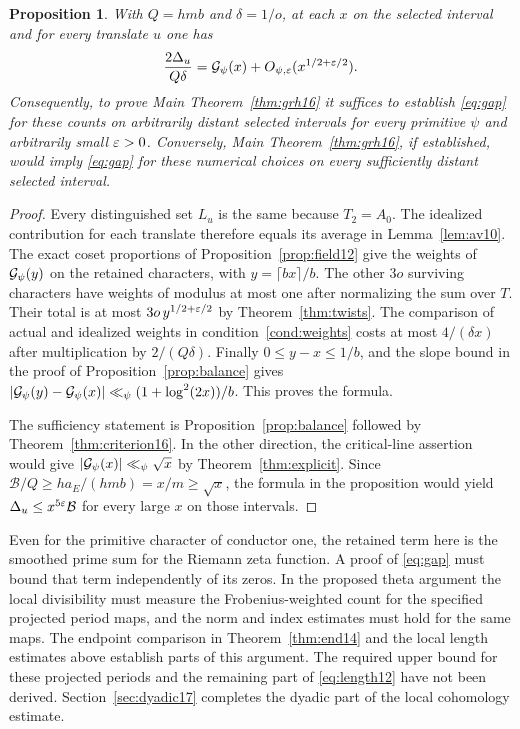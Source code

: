 \documentclass[a4paper,11pt]{article}
\newtheorem{proposition}{Proposition}[section]
\theoremstyle{definition}
\theoremstyle{remark}
\numberwithin{equation}{section}
\begin{document}
\begin{proposition}\label{prop:actual16}
With \(Q=hmb\) and \(\delta=1/o\), at each \(x\) on the selected interval and for every translate \(u\) one has
\[
       \frac{2\Delta_u}{Q\delta}
          =\mathcal G_\psi(x)+O_{\psi,\varepsilon}(x^{1/2+\varepsilon/2}).
\]
Consequently, to prove Main Theorem~\ref{thm:grh16} it suffices to establish \eqref{eq:gap} for these counts on arbitrarily distant selected intervals for every primitive \(\psi\) and arbitrarily small \(\varepsilon>0\). Conversely, Main Theorem~\ref{thm:grh16}, if established, would imply \eqref{eq:gap} for these numerical choices on every sufficiently distant selected interval.
\end{proposition}
\begin{proof}
Every distinguished set \(L_u\) is the same because \(T_2=A_0\). The idealized contribution for each translate therefore equals its average in Lemma~\ref{lem:av10}. The exact coset proportions of Proposition~\ref{prop:field12} give the weights of \(\mathcal G_\psi(y)\) on the retained characters, with \(y=\lceil bx\rceil/b\). The other \(3o\) surviving characters have weights of modulus at most one after normalizing the sum over \(T\). Their total is at most \(3o\,y^{1/2+\varepsilon/2}\) by Theorem~\ref{thm:twists}. The comparison of actual and idealized weights in condition~\ref{cond:weights} costs at most \(4/(\delta x)\) after multiplication by \(2/(Q\delta)\). Finally \(0\le y-x\le1/b\), and the slope bound in the proof of Proposition~\ref{prop:balance} gives \(|\mathcal G_\psi(y)-\mathcal G_\psi(x)|\ll_\psi(1+\log^2(2x))/b\). This proves the formula.

The sufficiency statement is Proposition~\ref{prop:balance} followed by Theorem~\ref{thm:criterion16}. In the other direction, the critical-line assertion would give \(|\mathcal G_\psi(x)|\ll_\psi\sqrt x\) by Theorem~\ref{thm:explicit}. Since \(\mathcal B/Q\ge h a_E/(hmb)=x/m\ge\sqrt x\), the formula in the proposition would yield \(\Delta_u\le x^{5\varepsilon}\mathcal B\) for every large \(x\) on those intervals.
\end{proof}

Even for the primitive character of conductor one, the retained term here is the smoothed prime sum for the Riemann zeta function. A proof of \eqref{eq:gap} must bound that term independently of its zeros. In the proposed theta argument the local divisibility must measure the Frobenius-weighted count for the specified projected period maps, and the norm and index estimates must hold for the same maps. The endpoint comparison in Theorem~\ref{thm:end14} and the local length estimates above establish parts of this argument. The required upper bound for these projected periods and the remaining part of \eqref{eq:length12} have not been derived. Section~\ref{sec:dyadic17} completes the dyadic part of the local cohomology estimate.
\end{document}
